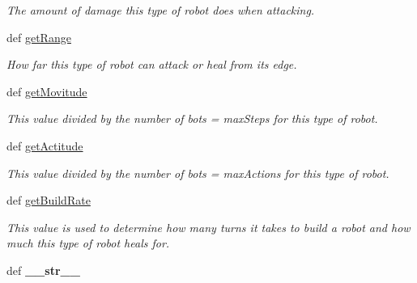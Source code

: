 \begin{DoxyCompactItemize}
\begin{DoxyCompactList}\small\item\em The amount of damage this type of robot does when attacking. \item\end{DoxyCompactList}\item 
\hypertarget{classGameObject_1_1Type_a580b3d9dbb81cdd1954318800422db75}{
def \hyperlink{classGameObject_1_1Type_a580b3d9dbb81cdd1954318800422db75}{getRange}}
\label{classGameObject_1_1Type_a580b3d9dbb81cdd1954318800422db75}

\begin{DoxyCompactList}\small\item\em How far this type of robot can attack or heal from its edge. \item\end{DoxyCompactList}\item 
\hypertarget{classGameObject_1_1Type_a1b955c2cf04692c2613dddf8e19bdbf2}{
def \hyperlink{classGameObject_1_1Type_a1b955c2cf04692c2613dddf8e19bdbf2}{getMovitude}}
\label{classGameObject_1_1Type_a1b955c2cf04692c2613dddf8e19bdbf2}

\begin{DoxyCompactList}\small\item\em This value divided by the number of bots = maxSteps for this type of robot. \item\end{DoxyCompactList}\item 
\hypertarget{classGameObject_1_1Type_af813e0a11a084c09820a600cae8ac031}{
def \hyperlink{classGameObject_1_1Type_af813e0a11a084c09820a600cae8ac031}{getActitude}}
\label{classGameObject_1_1Type_af813e0a11a084c09820a600cae8ac031}

\begin{DoxyCompactList}\small\item\em This value divided by the number of bots = maxActions for this type of robot. \item\end{DoxyCompactList}\item 
\hypertarget{classGameObject_1_1Type_a8c1e9901918a6acccd7e45dc9527894f}{
def \hyperlink{classGameObject_1_1Type_a8c1e9901918a6acccd7e45dc9527894f}{getBuildRate}}
\label{classGameObject_1_1Type_a8c1e9901918a6acccd7e45dc9527894f}

\begin{DoxyCompactList}\small\item\em This value is used to determine how many turns it takes to build a robot and how much this type of robot heals for. \item\end{DoxyCompactList}\item 
\hypertarget{classGameObject_1_1Type_ae31f5db029f8213edf2386587655fec7}{
def {\bfseries \_\-\_\-str\_\-\_\-}}
\label{classGameObject_1_1Type_ae31f5db029f8213edf2386587655fec7}

\end{DoxyCompactItemize}
